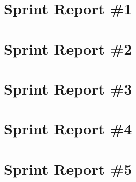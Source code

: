 
\section{Sprint Report \#1}


\section{Sprint Report \#2}


\section{Sprint Report \#3}


\section{Sprint Report \#4}


\section{Sprint Report \#5}
